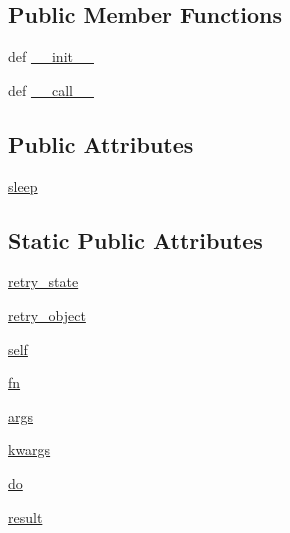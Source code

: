 \subsection*{Public Member Functions}
\begin{DoxyCompactItemize}
\item 
def \hyperlink{classpip_1_1__vendor_1_1tenacity_1_1tornadoweb_1_1TornadoRetrying_a7ecb514b89d0624eb35f529eb0bf86ff}{\+\_\+\+\_\+init\+\_\+\+\_\+}
\item 
def \hyperlink{classpip_1_1__vendor_1_1tenacity_1_1tornadoweb_1_1TornadoRetrying_a2a78398ad6184bdbabb1fe90c583f7e7}{\+\_\+\+\_\+call\+\_\+\+\_\+}
\end{DoxyCompactItemize}
\subsection*{Public Attributes}
\begin{DoxyCompactItemize}
\item 
\hyperlink{classpip_1_1__vendor_1_1tenacity_1_1tornadoweb_1_1TornadoRetrying_a9a50079ab5173424205fc2227911d1b1}{sleep}
\end{DoxyCompactItemize}
\subsection*{Static Public Attributes}
\begin{DoxyCompactItemize}
\item 
\hyperlink{classpip_1_1__vendor_1_1tenacity_1_1tornadoweb_1_1TornadoRetrying_ab59496951a62953bf56c77461ebedc4c}{retry\+\_\+state}
\item 
\hyperlink{classpip_1_1__vendor_1_1tenacity_1_1tornadoweb_1_1TornadoRetrying_ae4f2cab592847adf0ed39e28d7f958ed}{retry\+\_\+object}
\item 
\hyperlink{classpip_1_1__vendor_1_1tenacity_1_1tornadoweb_1_1TornadoRetrying_abecd868359a59ae2f6ed6eb42b585b41}{self}
\item 
\hyperlink{classpip_1_1__vendor_1_1tenacity_1_1tornadoweb_1_1TornadoRetrying_a87155ac17fe83abce469a666c7dd68ad}{fn}
\item 
\hyperlink{classpip_1_1__vendor_1_1tenacity_1_1tornadoweb_1_1TornadoRetrying_a435fe54780f44de26abc0d5a05911dcb}{args}
\item 
\hyperlink{classpip_1_1__vendor_1_1tenacity_1_1tornadoweb_1_1TornadoRetrying_aa8f934686d57fc3f63a0979afd3003ea}{kwargs}
\item 
\hyperlink{classpip_1_1__vendor_1_1tenacity_1_1tornadoweb_1_1TornadoRetrying_a3a99f43a66e15fbee335f85d8a2bc295}{do}
\item 
\hyperlink{classpip_1_1__vendor_1_1tenacity_1_1tornadoweb_1_1TornadoRetrying_a2e4de2275823a19bb35ca727fd2496a9}{result}
\end{DoxyCompactItemize}


